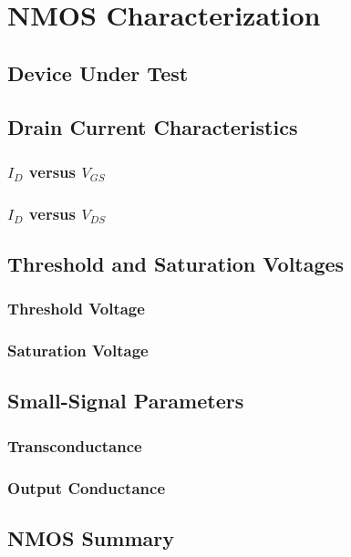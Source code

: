 
\section{NMOS Characterization}
\label{sec:nmos_characterization}

\subsection{Device Under Test}



\subsection{Drain Current Characteristics}

\subsubsection{$I_D$ versus $V_{GS}$}



\subsubsection{$I_D$ versus $V_{DS}$}



\subsection{Threshold and Saturation Voltages}

\subsubsection{Threshold Voltage}



\subsubsection{Saturation Voltage}



\subsection{Small-Signal Parameters}

\subsubsection{Transconductance}



\subsubsection{Output Conductance}



\subsection{NMOS Summary}

